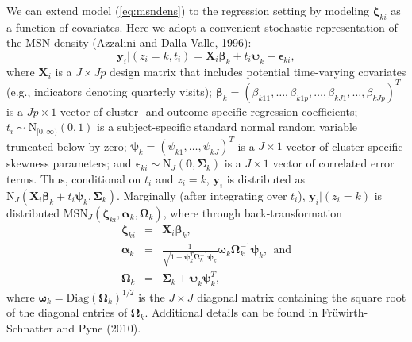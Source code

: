 \documentclass[useAMS,referee]{biom}
\begin{document}
We can extend model (\ref{eq:msndens}) to the regression setting by modeling $\boldsymbol\zeta_{ki}$ as a function of covariates. Here we adopt a convenient stochastic representation of the MSN density (Azzalini and Dalla Valle, 1996):
\begin{equation}
\mathbf{y}_{i}|(z_i=k,t_i) = \mathbf{X}_i \boldsymbol\beta_k + t_i \boldsymbol\psi_k + \boldsymbol\epsilon_{ki}, \label{eq:msnreg}
\end{equation}
where 
$\mathbf{X}_i$ is a $J \times Jp$ design matrix that includes potential time-varying covariates (e.g., indicators denoting quarterly visits); $\boldsymbol{\beta}_k=(\beta_{k11},\ldots,\beta_{k1p},\ldots,\beta_{kJ1},\ldots,\beta_{kJp})^T$ is a $Jp\times 1$ vector of cluster- and outcome-specific regression coefficients; $t_i\sim \text{N}_{[0,\infty)}(0,1)$ is a subject-specific standard normal random variable truncated below by zero; $\boldsymbol\psi_k=(\psi_{k1},\ldots,\psi_{kJ})^T$ is a $J \times 1$ vector of cluster-specific skewness parameters; and $\boldsymbol{\epsilon}_{ki} \sim \text{N}_J(\boldsymbol0,\boldsymbol\Sigma_k)$ is a $J\times 1$ vector of correlated error terms. Thus, conditional on $t_i$ and $z_i=k$, $\boldsymbol{y}_i$ is distributed as $\text{N}_J(\mathbf{X}_i \boldsymbol\beta_k + t_i \boldsymbol\psi_k, \boldsymbol{\Sigma}_k)$. Marginally (after integrating over $t_i$), $\mathbf{y}_i|(z_i = k)$ is distributed $\text{MSN}_J(\boldsymbol\zeta_{ki}, \boldsymbol\alpha_k, \boldsymbol\Omega_k)$, where through back-transformation 
\begin{eqnarray}
\boldsymbol\zeta_{ki} &=& \mathbf{X}_i\boldsymbol\beta_k, \nonumber \\
\boldsymbol\alpha_k &=& \frac{1}{\sqrt{1 - \boldsymbol\psi_k^T 
\boldsymbol\Omega^{-1}_k\boldsymbol\psi_k}} \boldsymbol\omega_k \boldsymbol\Omega^{-1}_k\boldsymbol\psi_k,~~\text{and} \label{eq:back_transform}\\
\boldsymbol\Omega_k &=& \boldsymbol\Sigma_k  + \boldsymbol\psi_k \boldsymbol\psi_k^T \nonumber,
\end{eqnarray}
where $\boldsymbol\omega_k = \text{Diag}(\boldsymbol\Omega_k)^{1/2}$ is the $J \times J$ diagonal matrix containing the square root of the diagonal entries of $\boldsymbol\Omega_k$. Additional details can be found in Fr\"{u}wirth-Schnatter and Pyne (2010). 
\end{document}
